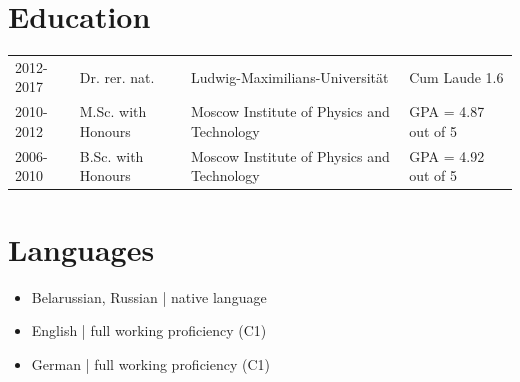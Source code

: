 \documentclass[a4paper,10pt]{article}
\begin{document}
\section*{Education}
\begin{tabular}{llll}
2012-2017 & Dr. rer. nat. & Ludwig-Maximilians-Universit{\"a}t & Cum Laude 1.6  \\ 
2010-2012 &  M.Sc. with Honours & Moscow Institute of Physics and
Technology & GPA = 4.87 out of 5\\
2006-2010 & B.Sc. with Honours & Moscow Institute of Physics and
Technology &  GPA = 4.92 out of 5\\
\end{tabular}
\section*{Languages} 
\begin{itemize}
\item Belarussian, Russian | native language
\item English | full working proficiency (C1)
\item German | full working proficiency (C1)
\end{itemize}
\end{document}
